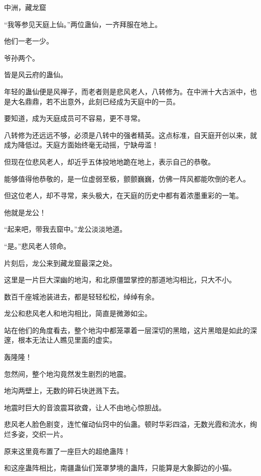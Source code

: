 
\begin{this_body}

中洲，藏龙窟

“我等参见天庭上仙。”两位蛊仙，一齐拜服在地上。

他们一老一少。

爷孙两个。

皆是风云府的蛊仙。

年轻的蛊仙便是风禅子，而老者则是悲风老人，八转修为。在中洲十大古派中，也是大名鼎鼎，若不出意外，此刻已经成为天庭中的一员。

要知道，成为天庭成员可不容易，更不寻常。

八转修为还远远不够，必须是八转中的强者精英。这点标准，自天庭开创以来，就成为降低过。天庭方面始终毫无动摇，宁缺毋滥！

但现在位悲风老人，却近乎五体投地地跪在地上，表示自己的恭敬。

能够值得他恭敬的，是一位虚弱至极，颤颤巍巍，仿佛一阵风都能吹倒的老人。

但这位老人，却不寻常，来头极大，在天庭的历史中都有着浓墨重彩的一笔。

他就是龙公！

“起来吧，带我去窟中。”龙公淡淡地道。

“是。”悲风老人领命。

片刻后，龙公来到藏龙窟最深之处。

这里是一片巨大深幽的地沟，和北原僵盟掌控的那道地沟相比，只大不小。

数百千座城池装进去，都是轻轻松松，绰绰有余。

龙公和悲风老人和地沟相比，简直是微渺如尘。

站在他们的角度看去，整个地沟中都笼罩着一层深切的黑暗，这片黑暗是如此的深邃，根本无法让人瞧见里面的虚实。

轰隆隆！

忽然间，整个地沟竟然发生剧烈的地震。

地沟两壁上，无数的碎石块迸溅下去。

地震时巨大的音浪震耳欲聋，让人不由地心惊胆战。

悲风老人脸色剧变，连忙催动仙窍中的仙蛊。顿时华彩四溢，无数光霞和流水，绚烂多姿，交织一片。

原来这里竟布置了一座巨大的超绝蛊阵！

和这座蛊阵相比，南疆蛊仙们笼罩梦境的蛊阵，只能算是大象脚边的小猫。


\end{this_body}
